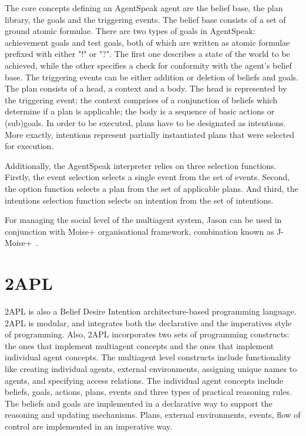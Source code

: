 \documentclass[a4paper,12pt,oneside,fleqn]{book} %
\begin{document}
The core concepts defining an AgentSpeak agent are the belief base, the
plan library, the goals and the triggering events. The belief base consists
of a set of ground atomic formulae. There are two types of goals in
AgentSpeak: achievement goals and test goals, both of which are written as
atomic formulae prefixed with either "!" or "?". The first one describes a
state of the world to be achieved, while the other specifies a check for
conformity with the agent's belief base. The triggering events can be
either addition or deletion of beliefs and goals. The plan consists of a
head, a context and a body. The head is represented by the triggering
event; the context comprises of a conjunction of beliefs which determine if a
plan is applicable; the body is a sequence of basic actions or
(sub)goals. In order to be executed, plans have to be designated as
intentions. More exactly, intentions represent partially instantiated
plans that were selected for execution.

Additionally, the AgentSpeak interpreter relies on three selection
functions. Firstly, the event selection selects a single event from the set
of events. Second, the option function selects a plan from the set of
applicable plans. And third, the intentions selection function selects an
intention from the set of intentions.

For managing the social level of the multiagent system, Jason can be used
in conjunction with Moise+ organisational framework, combination known as
J-Moise+~\cite{hubner2007j}.


\section{2APL} %
2APL is also a Belief Desire Intention architecture-based programming
language. 2APL is modular, and integrates both the declarative and the
imperatives style of programming. Also, 2APL incorporates two sets of
programming constructs: the ones that implement multiagent concepts and the
ones that implement individual agent concepts. The multiagent level
constructs include functionality like creating individual agents, external
environments, assigning unique names to agents, and specifying access
relations. The individual agent concepts include beliefs, goals, actions,
plans, events and three types of practical reasoning rules. The beliefs and
goals are implemented in a declarative way to support the reasoning and
updating mechanisms. Plans, external environments, events, flow of control
are implemented in an imperative way.
\end{document}
